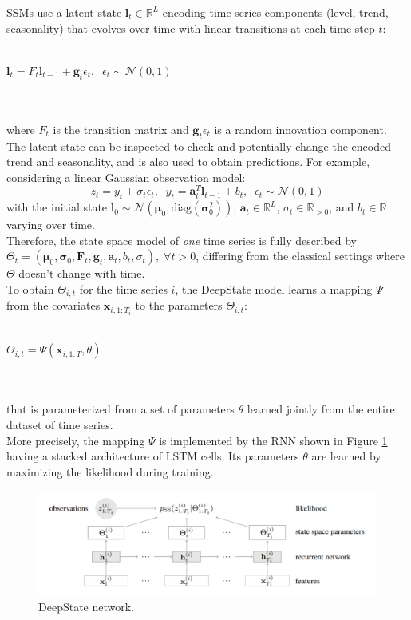\documentclass[a4paper, 12pt]{article} %
\begin{document}
	SSMs use a latent state $\pmb{l}_t \in \mathbb{R}^L$ encoding time series components (level, trend, seasonality) that evolves over time with linear transitions at each time step $t$:\\\\
	\centerline{
	$
	\pmb{l}_t = F_t \pmb{l}_{t-1} + \pmb{g }_t \epsilon_t, \;\; \epsilon_t \sim \mathcal{N}(0,1)
	$
	}\\\\
	where $F_t$ is the transition matrix and $\pmb{g }_t \epsilon_t$ is a random innovation component. The latent state can be inspected to check and potentially change the encoded trend and seasonality, and is also used to obtain predictions. For example, considering a linear Gaussian observation model:
	\begin{equation} \label{eq:deepstate}
			z_t = y_t + \sigma_t \epsilon_t, \;\; y_t = \pmb{a}_t^T \pmb{l}_{t-1} + b_t, \;\; \epsilon_t \sim \mathcal{N}(0,1)
	\end{equation}
	with the initial state $\pmb{l}_0 \sim \mathcal{N}(\pmb{\mu}_0, \text{diag}(\pmb{\sigma}_0^2))$, $\pmb{a}_t \in \mathbb{R}^L$, $\sigma_t \in \mathbb{R}_{>0}$, and $b_t \in \mathbb{R}$ varying over time. \\
	Therefore, the state space model of \textit{one} time series is fully described by $\Theta_t = (\pmb{\mu}_0, \pmb{\sigma}_0, \pmb{F}_t, \pmb{g}_ t, \pmb{a}_t, b_t, \sigma_t), \; \forall t > 0$, differing from the classical settings where $\Theta$ doesn't change with time.\\
	To obtain $\Theta_{i,t}$ for the time series $i$, the DeepState model learns a mapping $\Psi$ from the covariates $\pmb{x}_{i, 1:T_i}$ to the parameters $\Theta_{i, t}$:\\\\
	\centerline{
	$
	\Theta_{i,t} = \Psi(\pmb{x}_{i, 1:T}, \theta)
	$
	}\\\\
	that is parameterized from a set of parameters $\theta$ learned jointly from the entire dataset of time series. \\
	More precisely, the mapping $\Psi$ is implemented by the RNN shown in Figure \ref{fig:deepstate} having a stacked architecture of LSTM cells. Its parameters $\theta$ are learned by maximizing the likelihood during training.
	\begin{figure}
		\includegraphics[width=\linewidth]{img/deepstate.png}
		\caption{DeepState network.}
		\label{fig:deepstate}
	\end{figure}
\end{document}

